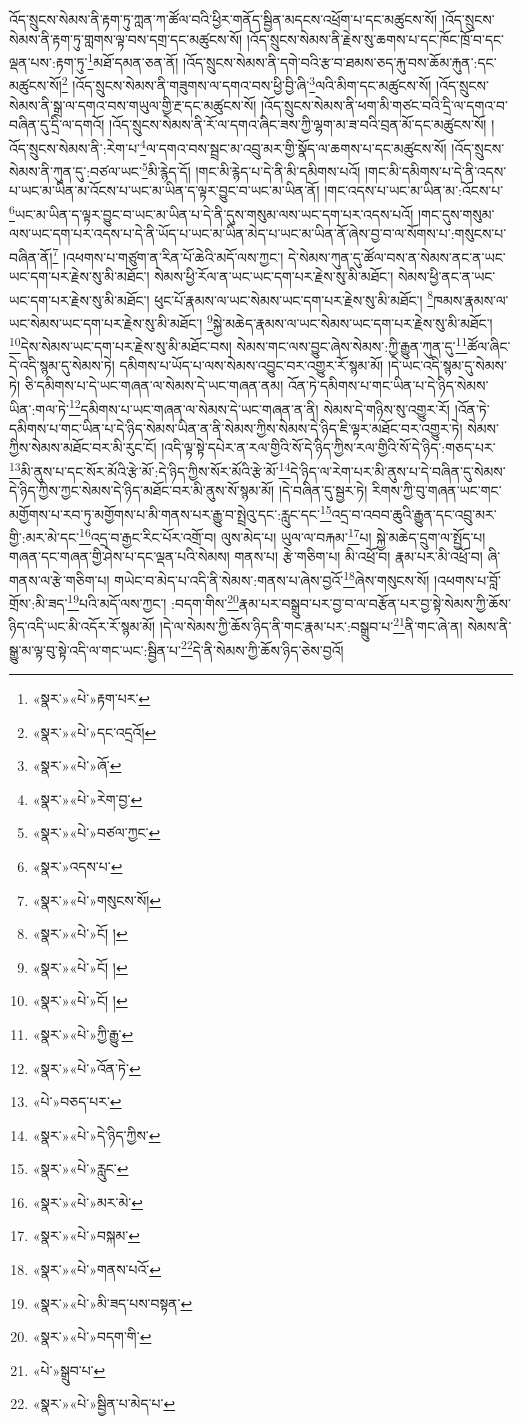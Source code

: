 འོད་སྲུངས་སེམས་ནི་རྟག་ཏུ་ཀླན་ཀ་ཚོལ་བའི་ཕྱིར་གནོད་སྦྱིན་མདངས་འཕྲོག་པ་དང་མཚུངས་སོ། །འོད་སྲུངས་སེམས་ནི་རྟག་ཏུ་གླགས་ལྟ་བས་དགྲ་དང་མཚུངས་སོ། །འོད་སྲུངས་སེམས་ནི་རྗེས་སུ་ཆགས་པ་དང་ཁོང་ཁྲོ་བ་དང་ལྡན་པས་:རྟག་ཏུ་\footnote{«སྣར་»«པེ་»རྟག་པར་}མཐོ་དམན་ཅན་ནོ། །འོད་སྲུངས་སེམས་ནི་དགེ་བའི་རྩ་བ་ཐམས་ཅད་རྐུ་བས་ཆོམ་རྐུན་:དང་མཚུངས་སོ།\footnote{«སྣར་»«པེ་»དང་འདྲའོ།} །འོད་སྲུངས་སེམས་ནི་གཟུགས་ལ་དགའ་བས་ཕྱི་བྱི་ཞི་\footnote{«སྣར་»«པེ་»ཞོ་}ལའི་མིག་དང་མཚུངས་སོ། །འོད་སྲུངས་སེམས་ནི་སྒྲ་ལ་དགའ་བས་གཡུལ་གྱི་རྔ་དང་མཚུངས་སོ། །འོད་སྲུངས་སེམས་ནི་ཕག་མི་གཙང་བའི་དྲི་ལ་དགའ་བ་བཞིན་དུ་དྲི་ལ་དགའོ། །འོད་སྲུངས་སེམས་ནི་རོ་ལ་དགའ་ཞིང་ཟས་ཀྱི་ལྷག་མ་ཟ་བའི་བྲན་མོ་དང་མཚུངས་སོ། །འོད་སྲུངས་སེམས་ནི་:རེག་པ་\footnote{«སྣར་»«པེ་»རེག་བྱ་}ལ་དགའ་བས་སྦྲང་མ་འབྲུ་མར་གྱི་སྣོད་ལ་ཆགས་པ་དང་མཚུངས་སོ། །འོད་སྲུངས་སེམས་ནི་ཀུན་དུ་:བཙལ་ཡང་\footnote{«སྣར་»«པེ་»བཙལ་ཀྱང་}མི་རྙེད་དོ། །གང་མི་རྙེད་པ་དེ་ནི་མི་དམིགས་པའོ། །གང་མི་དམིགས་པ་དེ་ནི་འདས་པ་ཡང་མ་ཡིན་མ་འོངས་པ་ཡང་མ་ཡིན་ད་ལྟར་བྱུང་བ་ཡང་མ་ཡིན་ནོ། །གང་འདས་པ་ཡང་མ་ཡིན་མ་:འོངས་པ་\footnote{«སྣར་»འདས་པ་}ཡང་མ་ཡིན་ད་ལྟར་བྱུང་བ་ཡང་མ་ཡིན་པ་དེ་ནི་དུས་གསུམ་ལས་ཡང་དག་པར་འདས་པའོ། །གང་དུས་གསུམ་ལས་ཡང་དག་པར་འདས་པ་དེ་ནི་ཡོད་པ་ཡང་མ་ཡིན་མེད་པ་ཡང་མ་ཡིན་ནོ་ཞེས་བྱ་བ་ལ་སོགས་པ་:གསུངས་པ་བཞིན་ནོ།\footnote{«སྣར་»«པེ་»གསུངས་སོ།} །འཕགས་པ་གཙུག་ན་རིན་པོ་ཆེའི་མདོ་ལས་ཀྱང་། དེ་སེམས་ཀུན་དུ་ཚོལ་བས་ན་སེམས་ནང་ན་ཡང་ཡང་དག་པར་རྗེས་སུ་མི་མཐོང་། སེམས་ཕྱི་རོལ་ན་ཡང་ཡང་དག་པར་རྗེས་སུ་མི་མཐོང་། སེམས་ཕྱི་ནང་ན་ཡང་ཡང་དག་པར་རྗེས་སུ་མི་མཐོང་། ཕུང་པོ་རྣམས་ལ་ཡང་སེམས་ཡང་དག་པར་རྗེས་སུ་མི་མཐོང་། \footnote{«སྣར་»«པེ་»ངོ། ། }ཁམས་རྣམས་ལ་ཡང་སེམས་ཡང་དག་པར་རྗེས་སུ་མི་མཐོང་། \footnote{«སྣར་»«པེ་»ངོ། ། }སྐྱེ་མཆེད་རྣམས་ལ་ཡང་སེམས་ཡང་དག་པར་རྗེས་སུ་མི་མཐོང་། \footnote{«སྣར་»«པེ་»ངོ། ། }དེས་སེམས་ཡང་དག་པར་རྗེས་སུ་མི་མཐོང་བས། སེམས་གང་ལས་བྱུང་ཞེས་སེམས་:ཀྱི་རྒྱུན་ཀུན་དུ་\footnote{«སྣར་»«པེ་»ཀྱི་རྒྱུ་}ཚོལ་ཞིང་དེ་འདི་སྙམ་དུ་སེམས་ཏེ། དམིགས་པ་ཡོད་པ་ལས་སེམས་འབྱུང་བར་འགྱུར་རོ་སྙམ་མོ། །དེ་ཡང་འདི་སྙམ་དུ་སེམས་ཏེ། ཅི་དམིགས་པ་དེ་ཡང་གཞན་ལ་སེམས་དེ་ཡང་གཞན་ནམ། འོན་ཏེ་དམིགས་པ་གང་ཡིན་པ་དེ་ཉིད་སེམས་ཡིན་:གལ་ཏེ་\footnote{«སྣར་»«པེ་»འོན་ཏེ་}དམིགས་པ་ཡང་གཞན་ལ་སེམས་དེ་ཡང་གཞན་ན་ནི། སེམས་དེ་གཉིས་སུ་འགྱུར་རོ། །འོན་ཏེ་དམིགས་པ་གང་ཡིན་པ་དེ་ཉིད་སེམས་ཡིན་ན་ནི་སེམས་ཀྱིས་སེམས་དེ་ཉིད་ཇི་ལྟར་མཐོང་བར་འགྱུར་ཏེ། སེམས་ཀྱིས་སེམས་མཐོང་བར་མི་རུང་ངོ། །འདི་ལྟ་སྟེ་དཔེར་ན་རལ་གྱིའི་སོ་དེ་ཉིད་ཀྱིས་རལ་གྱིའི་སོ་དེ་ཉིད་:གཅད་པར་\footnote{«པེ་»བཅད་པར་}མི་ནུས་པ་དང་སོར་མོའི་རྩེ་མོ་:དེ་ཉིད་ཀྱིས་སོར་མོའི་རྩེ་མོ་\footnote{«སྣར་»«པེ་»དེ་ཉིད་ཀྱིས་}དེ་ཉིད་ལ་རེག་པར་མི་ནུས་པ་དེ་བཞིན་དུ་སེམས་དེ་ཉིད་ཀྱིས་ཀྱང་སེམས་དེ་ཉིད་མཐོང་བར་མི་ནུས་སོ་སྙམ་མོ། །དེ་བཞིན་དུ་སྦྱར་ཏེ། རིགས་ཀྱི་བུ་གཞན་ཡང་གང་མགྱོགས་པ་རབ་ཏུ་མགྱོགས་པ་མི་གནས་པར་རྒྱུ་བ་སྤྲེའུ་དང་:རླུང་དང་\footnote{«སྣར་»«པེ་»རླུང་}འདྲ་བ་འབབ་ཆུའི་རྒྱུན་དང་འབྲུ་མར་གྱི་:མར་མེ་དང་\footnote{«སྣར་»«པེ་»མར་མེ་}འདྲ་བ་རྒྱང་རིང་པོར་འགྲོ་བ། ལུས་མེད་པ། ཡུལ་ལ་བརྐམ་\footnote{«སྣར་»«པེ་»བསྐམ་}པ། སྐྱེ་མཆེད་དྲུག་ལ་སྤྱོད་པ། གཞན་དང་གཞན་གྱི་ཤེས་པ་དང་ལྡན་པའི་སེམས། གནས་པ། རྩེ་གཅིག་པ། མི་འཕྲོ་བ། རྣམ་པར་མི་འཕྲོ་བ། ཞི་གནས་ལ་རྩེ་གཅིག་པ། གཡེང་བ་མེད་པ་འདི་ནི་སེམས་:གནས་པ་ཞེས་བྱའོ་\footnote{«སྣར་»«པེ་»གནས་པའོ་}ཞེས་གསུངས་སོ། །འཕགས་པ་བློ་གྲོས་:མི་ཟད་\footnote{«སྣར་»«པེ་»མི་ཟད་པས་བསྟན་}པའི་མདོ་ལས་ཀྱང་། :བདག་གིས་\footnote{«སྣར་»«པེ་»བདག་གི་}རྣམ་པར་བསྒྲུབ་པར་བྱ་བ་ལ་བརྩོན་པར་བྱ་སྟེ་སེམས་ཀྱི་ཆོས་ཉིད་འདི་ཡང་མི་འདོར་རོ་སྙམ་མོ། །དེ་ལ་སེམས་ཀྱི་ཆོས་ཉིད་ནི་གང་རྣམ་པར་:བསྒྲུབ་པ་\footnote{«པེ་»སྒྲུབ་པ་}ནི་གང་ཞེ་ན། སེམས་ནི་སྒྱུ་མ་ལྟ་བུ་སྟེ་འདི་ལ་གང་ཡང་:སྦྱིན་པ་\footnote{«སྣར་»«པེ་»སྦྱིན་པ་མེད་པ་}དེ་ནི་སེམས་ཀྱི་ཆོས་ཉིད་ཅེས་བྱའོ། 
